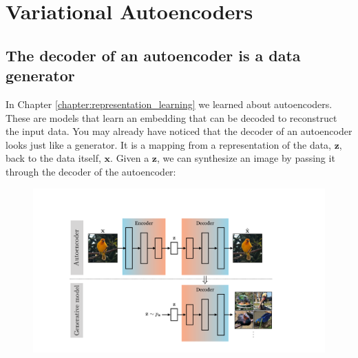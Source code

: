 \section{Variational Autoencoders}

\subsection{The decoder of an autoencoder is a data generator}
In Chapter \ref{chapter:representation_learning} we learned about autoencoders. These are models that learn an embedding that can be decoded to reconstruct the input data. You may already have noticed that the decoder of an autoencoder looks just like a generator. It is a mapping from a representation of the data, $\mathbf{z}$, back to the data itself, $\mathbf{x}$. Given a $\mathbf{z}$, we can synthesize an image by passing it through the decoder of the autoencoder:
\begin{figure}[h!]
    \centering
    \includegraphics[width=0.8\linewidth]{./figures/generative_modeling_and_representation_learning/autoencoder_to_generative_model.pdf}
    \label{fig:generative_modeling_and_representation_learning:autoencoder_to_generative_model}
\end{figure}

